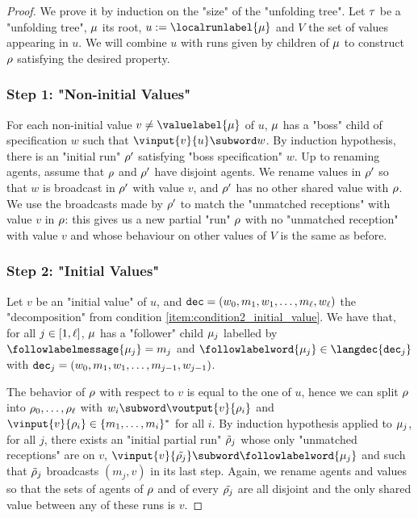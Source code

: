 \begin{proof}
We prove it by induction on the "size" of the "unfolding tree".
Let $\tau$ be a "unfolding tree", $\mu$ its root, $u := \localrunlabel{\node}$ and $V$ the set of values appearing in $u$. 
We will combine $u$ with runs given by children of $\mu$ to construct $\rho$ satisfying the desired property.

\subsubsection{Step 1: "Non-initial Values"}
\label{sec:tree-to-run-step-one}

For each non-initial value $v \ne \valuelabel{\node}$ of $u$, $\mu$ has a "boss" child of specification $w$ such that $\vinput{v}{u} \subword w$.
By induction hypothesis, there is an "initial run" $\rho'$ satisfying "boss specification" $w$. Up to renaming agents, assume that $\rho$ and $\rho'$ have disjoint agents.
We rename values in $\rho'$ so that $w$ is broadcast in $\rho'$ with value $v$, and $\rho'$ has no other shared value with $\rho$. 
We use the broadcasts made by $\rho'$ to match the "unmatched receptions" with value $v$ in $\rho$: this gives us a new partial "run" $\rho$ with no "unmatched reception" with value $v$ and whose behaviour on other values of $V$ is the same as before.

\subsubsection{Step 2: "Initial Values"}
\label{sec:tree-to-run-step-two}


Let $v$ be an "initial value" of $u$, and $\mathtt{dec} = \\(w_0, m_1, w_1, \ldots, m_\ell, w_\ell)$ the "decomposition" from condition \ref{item:condition2_initial_value}. We have that, for all $j \in [1,\ell]$, $\mu$ has a "follower" child $\mu_j$ labelled by $\followlabelmessage{\node_j} = m_j$ and $\followlabelword{\node_j} \in \langdec{\decsymb_j}$ with $\mathtt{dec}_j = (w_0, m_1, w_1, \ldots, m_{j-1}, w_{j-1})$. 

The behavior of $\rho$ with respect to $v$ is equal to the one of $u$, hence we can split $\rho$ into $\rho_0, \ldots, \rho_\ell$ with $w_i \subword \voutput{\aval}{\run_i}$ and $\vinput{\aval}{\run_i} \in \set{m_1, \dots, m_{i}}^*$ for all $i$. 
By induction hypothesis applied to $\mu_j$, for all $j$, there exists an "initial partial run" $\Tilde{\rho}_j$ whose only "unmatched receptions" are on $v$, $\vinput{v}{\Tilde{\run_j}} \subword \followlabelword{\node_{j}}$ and such that $\Tilde{\rho}_j$ broadcasts $(m_j,v)$ in its last step. Again, we rename agents and values so that the sets of agents of $\rho$ and of every $\Tilde{\rho_j}$ are all disjoint and the only shared value between any of these runs is $v$. 


\end{proof}
